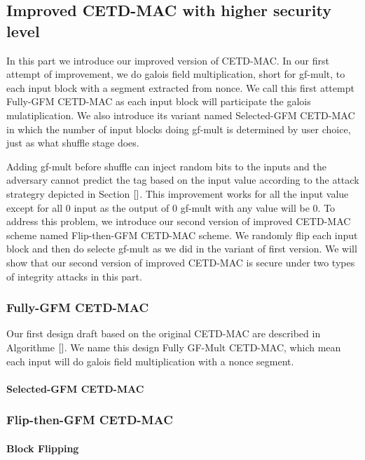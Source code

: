 \subsection{Improved CETD-MAC with higher security level}
In this part we introduce our improved version of CETD-MAC. In our first attempt
of improvement, we do galois field multiplication, short for gf-mult, to each input block with a
segment extracted from nonce. We call this first attempt Fully-GFM CETD-MAC as
each input block will participate the galois mulatiplication. We also introduce
its variant named Selected-GFM CETD-MAC in which the number of input blocks
doing gf-mult is determined by user choice, just as what shuffle stage does. 

Adding gf-mult before shuffle can inject random bits to the inputs and the
adversary cannot predict the tag based on the input value according to the
attack strategry depicted in Section $\ref{}$. This improvement works for all
the input value except for all 0 input as the output of 0 gf-mult with any value
will be 0. To address this problem, we introduce our second version of improved
CETD-MAC scheme named Flip-then-GFM CETD-MAC scheme. We randomly flip each input
block and then do selecte gf-mult as we did in the variant of first version. We
will show that our second version of improved CETD-MAC is secure under two types
of integrity attacks in this part. 
\subsubsection{Fully-GFM CETD-MAC}
Our first design draft based on the original CETD-MAC are described in
Algorithme $\ref{}$. We name this design Fully GF-Mult CETD-MAC, which mean each
input will do galois field multiplication with a nonce segment.  
\paragraph{}
\paragraph{Selected-GFM CETD-MAC}

\subsubsection{Flip-then-GFM CETD-MAC}

\paragraph{Block Flipping}
